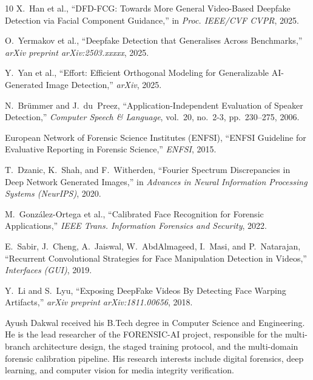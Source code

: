\documentclass[journal]{IEEEtran}
\begin{document}
\begin{thebibliography}{10}
X.~Han et al.,
``DFD-FCG: Towards More General Video-Based Deepfake Detection via Facial Component Guidance,''
in \emph{Proc. IEEE/CVF CVPR}, 2025.

O.~Yermakov et al.,
``Deepfake Detection that Generalises Across Benchmarks,''
\emph{arXiv preprint arXiv:2503.xxxxx}, 2025.

Y.~Yan et al.,
``Effort: Efficient Orthogonal Modeling for Generalizable AI-Generated Image Detection,''
\emph{arXiv}, 2025.

N.~Brümmer and J.~du~Preez,
``Application-Independent Evaluation of Speaker Detection,''
\emph{Computer Speech \& Language}, vol.~20, no.~2-3, pp.~230--275, 2006.

European Network of Forensic Science Institutes (ENFSI),
``ENFSI Guideline for Evaluative Reporting in Forensic Science,''
\emph{ENFSI}, 2015.

T.~Dzanic, K.~Shah, and F.~Witherden,
``Fourier Spectrum Discrepancies in Deep Network Generated Images,''
in \emph{Advances in Neural Information Processing Systems (NeurIPS)}, 2020.

M.~González-Ortega et al.,
``Calibrated Face Recognition for Forensic Applications,''
\emph{IEEE Trans. Information Forensics and Security}, 2022.

E.~Sabir, J.~Cheng, A.~Jaiswal, W.~AbdAlmageed, I.~Masi, and P.~Natarajan,
``Recurrent Convolutional Strategies for Face Manipulation Detection in Videos,''
\emph{Interfaces (GUI)}, 2019.

Y.~Li and S.~Lyu,
``Exposing DeepFake Videos By Detecting Face Warping Artifacts,''
\emph{arXiv preprint arXiv:1811.00656}, 2018.

\end{thebibliography}


\begin{IEEEbiographynophoto}{Ayush Dakwal}
received his B.Tech degree in Computer Science and Engineering. He is the lead researcher of the FORENSIC-AI project, responsible for the multi-branch architecture design, the staged training protocol, and the multi-domain forensic calibration pipeline. His research interests include digital forensics, deep learning, and computer vision for media integrity verification.
\end{IEEEbiographynophoto}
\end{document}

